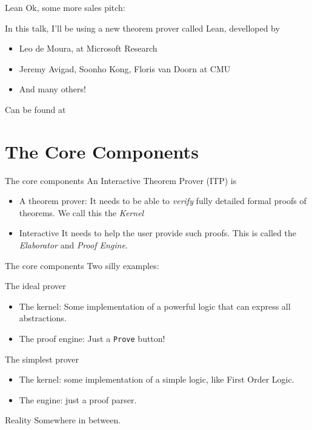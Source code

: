 \documentclass{beamer}
\begin{document}
\begin{frame}{Lean}
  Ok, some more sales pitch:\bigskip

  In this talk, I'll be using a new theorem prover called Lean, develloped by
  \begin{itemize}
  \item Leo de Moura, at Microsoft Research
  \item Jeremy Avigad, Soonho Kong, Floris van Doorn at CMU
  \item And many others!
  \end{itemize}

  Can be found at 
\end{frame}
  
\section{The Core Components}

\begin{frame}{The core components}
  An Interactive Theorem Prover (ITP) is
  \begin{itemize}
  \item
    \begin{block}{A theorem prover:}
      It needs to be able to \emph{verify} fully detailed formal
      proofs of theorems. We call this the \emph{Kernel}
    \end{block}
  \item
    \begin{block}{Interactive}
      It needs to help the user provide such proofs. This is called
      the \emph{Elaborator} and \emph{Proof Engine}.
    \end{block}
  \end{itemize}
\end{frame}

\begin{frame}{The core components}
  Two silly examples:
  \begin{block}{The ideal prover}
    \begin{itemize}
    \item The kernel: Some implementation of a powerful logic that can express all abstractions.
    \item The proof engine: Just a \texttt{Prove} button!
    \end{itemize}
  \end{block}
  \begin{block}{The simplest prover}
    \begin{itemize}
    \item The kernel: some implementation of a simple logic, like First Order Logic.
    \item The engine: just a proof parser.
    \end{itemize}
  \end{block}
  \begin{block}{Reality}
    Somewhere in between.
  \end{block}
\end{frame}
\end{document}
